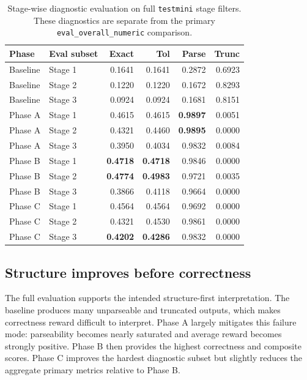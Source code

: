 \documentclass{article} %
\begin{document}
\begin{table}[t]
\centering
\scriptsize
\caption{Stage-wise diagnostic evaluation on full \texttt{testmini} stage filters. These diagnostics are separate from the primary \texttt{eval\_overall\_numeric} comparison.}
\label{tab:stage-diagnostics}
\begin{tabular}{llrrrr}
\toprule
Phase & Eval subset & Exact & Tol & Parse & Trunc \\
\midrule
Baseline & Stage 1 & 0.1641 & 0.1641 & 0.2872 & 0.6923 \\
Baseline & Stage 2 & 0.1220 & 0.1220 & 0.1672 & 0.8293 \\
Baseline & Stage 3 & 0.0924 & 0.0924 & 0.1681 & 0.8151 \\
Phase A & Stage 1 & 0.4615 & 0.4615 & \textbf{0.9897} & 0.0051 \\
Phase A & Stage 2 & 0.4321 & 0.4460 & \textbf{0.9895} & 0.0000 \\
Phase A & Stage 3 & 0.3950 & 0.4034 & 0.9832 & 0.0084 \\
Phase B & Stage 1 & \textbf{0.4718} & \textbf{0.4718} & 0.9846 & 0.0000 \\
Phase B & Stage 2 & \textbf{0.4774} & \textbf{0.4983} & 0.9721 & 0.0035 \\
Phase B & Stage 3 & 0.3866 & 0.4118 & 0.9664 & 0.0000 \\
Phase C & Stage 1 & 0.4564 & 0.4564 & 0.9692 & 0.0000 \\
Phase C & Stage 2 & 0.4321 & 0.4530 & 0.9861 & 0.0000 \\
Phase C & Stage 3 & \textbf{0.4202} & \textbf{0.4286} & 0.9832 & 0.0000 \\
\bottomrule
\end{tabular}
\end{table}

\subsection{Structure improves before correctness}

The full evaluation supports the intended structure-first interpretation. The baseline produces many unparseable and truncated outputs, which makes correctness reward difficult to interpret. Phase A largely mitigates this failure mode: parseability becomes nearly saturated and average reward becomes strongly positive. Phase B then provides the highest correctness and composite scores. Phase C improves the hardest diagnostic subset but slightly reduces the aggregate primary metrics relative to Phase B.
\end{document}
